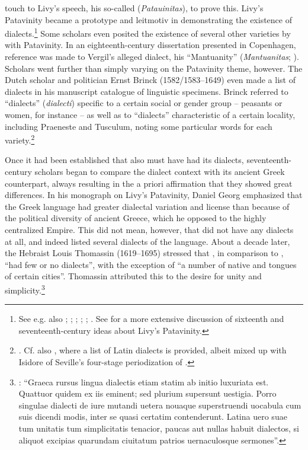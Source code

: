  touch to Livy’s speech, his so-called  (\textit{Patauinitas}), to prove this. Livy’s Patavinity became a prototype and leitmotiv in demonstrating the existence of  dialects.\footnote{See e.g. also \citet[b.viii\textsc{\textsuperscript{v}}]{Castiglione1528}; \citet[*.iii\textsc{\textsuperscript{r}}]{Estienne1582}; \citet[174, 176]{Schottel1663}; \citet[311]{Rice1765}; \citet[: \textsc{lix}]{Mazzarella-farao1779}; \citet[203--204]{Ries1786}. See \citet{VanRooy2018a} for a more extensive discussion of sixteenth and seventeenth-century ideas about Livy’s Patavinity.} Some scholars even posited the existence of several other  varieties by  with Patavinity. In an eighteenth-century dissertation presented in Copenhagen, reference was made to Vergil’s alleged  dialect, his “Mantuanity” (\textit{Mantuanitas}; \citealt[22]{Munthe1748}). Scholars went further than simply varying on the Patavinity theme, however. The Dutch scholar and politician Ernst Brinck (1582/1583–1649) even made a list of  dialects in his manuscript catalogue of linguistic specimens. Brinck referred to “dialects” (\textit{dialecti}) specific to a certain social or gender group – peasants or women, for instance – as well as to “dialects” characteristic of a certain locality, including Praeneste and Tusculum, noting some particular words for each variety.\footnote{\citet[56\textsc{\textsuperscript{v}}]{Brinck1615}. Cf. also \citet[43]{Stubbe1657}, where a list of Latin dialects is provided, albeit mixed up with Isidore of Seville’s four-stage periodization of .}

Once it had been established that  also must have had its dialects, seven\-teenth-century scholars began to compare the  dialect context with its ancient Greek counterpart, always resulting in the a priori affirmation that they showed great differences. In his monograph on Livy’s Patavinity, Daniel Georg \citet[146]{Morhof1685} emphasized that the Greek language had greater dialectal variation and license than  because of the political diversity of ancient Greece, which he opposed to the highly centralized  Empire. This did not mean, however, that  did not have any dialects at all, and \citet[148--149]{Morhof1685} indeed listed several dialects of the language. About a decade later, the Hebraist Louis Thomassin (1619–1695) stressed that , in comparison to , “had few or no dialects”, with the exception of “a number of native and  tongues of certain cities”. Thomassin attributed this to the  desire for unity and simplicity.\footnote{\citet[xix]{Thomassin1697}: “Graeca rursus lingua dialectis etiam statim ab initio luxuriata est. Quattuor quidem ex iis eminent; sed plurium supersunt uestigia. Porro singulae dialecti de iure mutandi uetera nouaque superstruendi uocabula cum suis dicendi modis, inter se quasi certatim contenderunt. Latina uero suae tum unitatis tum simplicitatis tenacior, paucas aut nullas habuit dialectos, si aliquot excipias quarundam ciuitatum patrios uernaculosque sermones”.}

